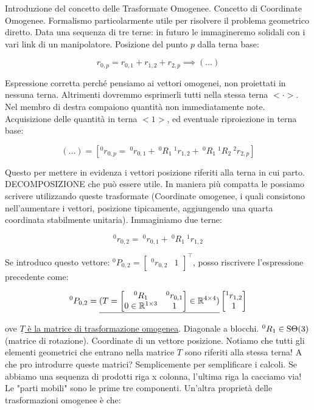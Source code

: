 Introduzione del concetto delle Trasformate Omogenee. Concetto di Coordinate Omogenee. Formalismo particolarmente utile per risolvere il problema geometrico diretto. Data una sequenza di tre terne: in futuro le immagineremo solidali con i vari link di un manipolatore. Posizione del punto $p$ dalla terna base:

\[
	r_{0,p} = r_{0,1}+r_{1,2}+r_{2,p} \implies (\dots)
\]

Espressione corretta perché pensiamo ai vettori omogenei, non proiettati in nessuna terna. Altrimenti dovremmo esprimerli tutti nella stessa terna $<\mathord{\cdot}>$. Nel membro di destra compaiono quantità non immediatamente note. Acquisizione delle quantità in terna $<1>$, ed eventuale riproiezione in terna base:

\[
	(\dots) = [^0r_{0,p} =\ ^0r_{0,1} +\ ^0R_1\ ^1r_{1,2} +\ ^0R_1\ ^1R_2\ ^2r_{2,p}]
\]

Questo per mettere in evidenza i vettori posizione riferiti alla terna in cui parto. DECOMPOSIZIONE che può essere utile. In maniera più compatta le possiamo scrivere utilizzando queste trasformate (Coordinate omogenee, i quali consistono nell'aumentare i vettori, posizione tipicamente, aggiungendo una quarta coordinata stabilmente unitaria). Immaginiamo due terne:

\[	
	^0r_{0,2} =\ ^0r_{0,1} +\ ^0R_1\ ^1r_{1,2}
\]

Se introduco questo vettore: $^0P_{0,2}=\begin{bmatrix}^0r_{0,2}&1\end{bmatrix}^\top$, posso riscrivere l'espressione precedente come:

\[
	^0P_{0,2} = \underline{(T = \begin{bmatrix}^0R_1&^0r_{0,1}\\0\in\mathbb{R}^{1\times 3}&1\end{bmatrix}\in\mathbb{R}^{4\times 4})}\begin{bmatrix}^1r_{1,2}\\1\end{bmatrix}
\]

ove \underline{$\underline{T}$ è la matrice di trasformazione omogenea}. Diagonale a blocchi. $^0R_1\in\operatorname{S\Theta}(3)$ (matrice di rotazione). Coordinate di un vettore posizione. Notiamo che tutti gli elementi geometrici che entrano nella matrice $T$ sono riferiti alla stessa terna! A che pro introdurre queste matrici? Semplicemente per semplificare i calcoli. Se abbiamo una sequenza di prodotti riga x colonna, l'ultima riga la cacciamo via! Le "parti mobili" sono le prime tre componenti. Un'altra proprietà delle trasformazioni omogenee è che:

